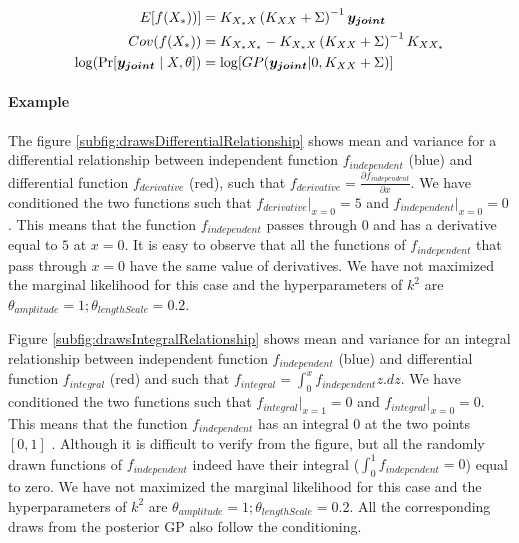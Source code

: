 \begin{align}
  E[f(X_{*}))] & = K_{X_{*}X}\left ( K_{XX} + \Sigma \right )^{-1}\boldsymbol{y_{joint}} \label{eq:predictiveMOMeanCh7} \\ 
  Cov(f(X_{*})) & = K_{X_{*}X_{*}} - K_{X_{*}X}\left ( K_{XX} + \Sigma \right )^{-1}K_{XX_{*}} \label{eq:predictiveMOCovarianceCh7} \\
  \log(\Pr[\boldsymbol{y_{joint}} \mid X, \theta]) & = \log[GP(\boldsymbol{y_{joint}}| 0, K_{XX} + \Sigma )] \label{eq:exactMONLMLCh7}
\end{align}

\paragraph{Example}
The figure \ref{subfig:drawsDifferentialRelationship} shows mean and variance for a differential relationship between independent function \(f_{independent}\) (blue) and differential function \(f_{derivative}\) (red), such that \(f_{derivative} = \frac{\partial f_{independent}}{\partial x}\). We have conditioned the two functions such that \(f_{derivative}|_{x = 0} = 5\) and \(f_{independent}|_{x = 0} = 0\). This means that the function \(f_{independent}\) passes through \(0\) and has a derivative equal to \(5\) at \(x = 0\). It is easy to observe that all the functions of \(f_{independent}\) that pass through $x=0$ have the same value of derivatives.
We have not maximized the marginal likelihood for this case and the hyperparameters of \(k^2\) are \(\theta_{amplitude} = 1; \theta_{lengthScale} = 0.2\). 

Figure \ref{subfig:drawsIntegralRelationship} shows mean and variance for an integral relationship between independent function \(f_{independent}\) (blue) and differential function \(f_{integral}\) (red) and such that \(f_{integral} = \int_0^x f_{independent}z . dz\). We have conditioned the two functions such that \(f_{integral}|_{x = 1} = 0\) and \(f_{integral}|_{x = 0} = 0\). This means that the function \(f_{independent}\) has an integral \(0\) at the two points \([0, 1]\) . Although it is difficult to verify from the figure, but all the randomly drawn functions of \(f_{independent}\) indeed have their integral ($\int_{0}^{1} f_{independent} = 0 $) equal to zero. We have not maximized the marginal likelihood for this case and the hyperparameters of \(k^2\) are \(\theta_{amplitude} = 1; \theta_{lengthScale} = 0.2\). All the corresponding draws from the posterior GP also follow the conditioning. 

